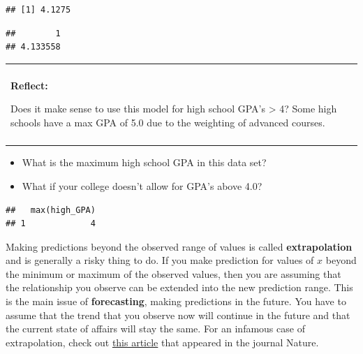 \documentclass[]{book}
\newenvironment{Shaded}{\begin{snugshade}}{\end{snugshade}}
\newcommand{\CommentTok}[1]{\textcolor[rgb]{0.56,0.35,0.01}{\textit{#1}}}
\newcommand{\DataTypeTok}[1]{\textcolor[rgb]{0.13,0.29,0.53}{#1}}
\newcommand{\FloatTok}[1]{\textcolor[rgb]{0.00,0.00,0.81}{#1}}
\newcommand{\KeywordTok}[1]{\textcolor[rgb]{0.13,0.29,0.53}{\textbf{#1}}}
\newcommand{\NormalTok}[1]{#1}
\newcommand{\OperatorTok}[1]{\textcolor[rgb]{0.81,0.36,0.00}{\textbf{#1}}}
\newcommand{\StringTok}[1]{\textcolor[rgb]{0.31,0.60,0.02}{#1}}
\providecommand{\tightlist}{%
  \setlength{\itemsep}{0pt}\setlength{\parskip}{0pt}}
\newenvironment{reflect}
{
    \begin{center}
    
    \begin{tabular}{|p{0.8\textwidth}|}
    \rowcolor{LightBlue}
    \hline\\
    \rowcolor{LightBlue}
    \textbf{Reflect:}
}
{
    \\\rowcolor{LightBlue}
    \\\hline
    \end{tabular} 
    \end{center}
}
\begin{document}
\begin{verbatim}
## [1] 4.1275
\end{verbatim}

\begin{Shaded}
\end{Shaded}

\begin{verbatim}
##        1 
## 4.133558
\end{verbatim}

\begin{reflect}
Does it make sense to use this model for high school GPA's
\textgreater{} 4? Some high schools have a max GPA of 5.0 due to the
weighting of advanced courses.
\end{reflect}

\begin{itemize}
\tightlist
\item
  What is the maximum high school GPA in this data set?
\item
  What if your college doesn't allow for GPA's above 4.0?
\end{itemize}

\begin{Shaded}
\end{Shaded}

\begin{verbatim}
##   max(high_GPA)
## 1             4
\end{verbatim}

Making predictions beyond the observed range of values is called \textbf{extrapolation} and is generally a risky thing to do. If you make prediction for values of \(x\) beyond the minimum or maximum of the observed values, then you are assuming that the relationship you observe can be extended into the new prediction range. This is the main issue of \textbf{forecasting}, making predictions in the future. You have to assume that the trend that you observe now will continue in the future and that the current state of affairs will stay the same. For an infamous case of extrapolation, check out \href{https://www.ncbi.nlm.nih.gov/pmc/articles/PMC3173856/}{this article} that appeared in the journal Nature.
\end{document}
